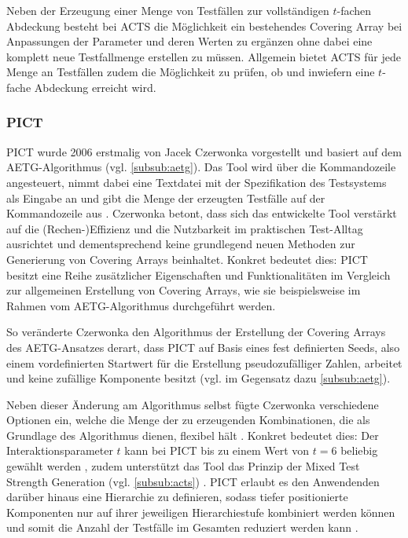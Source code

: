Neben der Erzeugung einer Menge von Testfällen zur vollständigen $t$-fachen Abdeckung besteht bei ACTS die Möglichkeit ein bestehendes Covering Array bei Anpassungen der Parameter und deren Werten zu ergänzen ohne dabei eine komplett neue Testfallmenge erstellen zu müssen. Allgemein bietet ACTS für jede Menge an Testfällen zudem die Möglichkeit zu prüfen, ob und inwiefern eine $t$-fache Abdeckung erreicht wird.

\subsubsection{PICT}\label{subsub:pict}
PICT \cite{czerwonka2006pairwise, pict} wurde 2006 erstmalig von Jacek Czerwonka vorgestellt und basiert auf dem AETG-Algorithmus (vgl. \autoref{subsub:aetg}). Das Tool wird über die Kommandozeile angesteuert, nimmt dabei eine Textdatei mit der Spezifikation des Testsystems als Eingabe an und gibt die Menge der erzeugten Testfälle auf der Kommandozeile aus \cite{pict}. Czerwonka \cite{czerwonka2006pairwise} betont, dass sich das entwickelte Tool verstärkt auf die (Rechen-)Effizienz und die Nutzbarkeit im praktischen \glqq Test-Alltag\grqq{} ausrichtet und dementsprechend keine grundlegend neuen Methoden zur Generierung von Covering Arrays beinhaltet. Konkret bedeutet dies: PICT besitzt eine Reihe zusätzlicher Eigenschaften und Funktionalitäten im Vergleich zur allgemeinen Erstellung von Covering Arrays, wie sie beispielsweise im Rahmen vom AETG-Algorithmus durchgeführt werden.

So veränderte Czerwonka den Algorithmus der Erstellung der Covering Arrays des AETG-Ansatzes derart, dass PICT auf Basis eines fest definierten Seeds, also einem vordefinierten Startwert für die Erstellung pseudozufälliger Zahlen, arbeitet und keine zufällige Komponente besitzt (vgl. im Gegensatz dazu \autoref{subsub:aetg}). 

Neben dieser Änderung am Algorithmus selbst fügte Czerwonka verschiedene Optionen ein, welche die Menge der zu erzeugenden Kombinationen, die als Grundlage des Algorithmus dienen, flexibel hält \cite{czerwonka2006pairwise}. Konkret bedeutet dies: Der Interaktionsparameter $t$ kann bei PICT bis zu einem Wert von $t = 6$ beliebig gewählt werden \cite{khalsa2014orchestrated}, zudem unterstützt das Tool das Prinzip der \glqq Mixed Test Strength Generation\grqq{} (vgl. \autoref{subsub:acts}) \cite{czerwonka2006pairwise}. PICT erlaubt es den Anwendenden darüber hinaus eine Hierarchie zu definieren, sodass tiefer positionierte Komponenten nur auf ihrer jeweiligen Hierarchiestufe kombiniert werden können und somit die Anzahl der Testfälle im Gesamten reduziert werden kann \cite{czerwonka2006pairwise}. 

